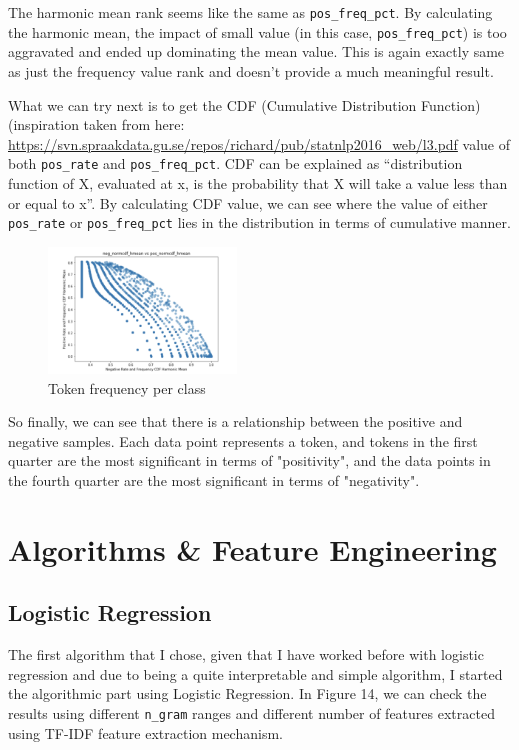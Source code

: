 \documentclass{article}
\begin{document}
The harmonic mean rank seems like the same as \texttt{pos\_freq\_pct}. By calculating the harmonic mean, the impact of small value (in this case, \texttt{pos\_freq\_pct}) is too aggravated and ended up dominating the mean value. This is again exactly same as just the frequency value rank and doesn’t provide a much meaningful result.

What we can try next is to get the CDF (Cumulative Distribution Function) (inspiration taken from here: \url{https://svn.spraakdata.gu.se/repos/richard/pub/statnlp2016_web/l3.pdf} value of both \texttt{pos\_rate} and \texttt{pos\_freq\_pct}. CDF can be explained as “distribution function of X, evaluated at x, is the probability that X will take a value less than or equal to x”. By calculating CDF value, we can see where the value of either \texttt{pos\_rate} or \texttt{pos\_freq\_pct} lies in the distribution in terms of cumulative manner.

	\begin{figure}[h]
		\label{Figure 12}
		\caption{Token frequency per class}
		\includegraphics[width=50mm]{norcdf.png}
		\centering
	\end{figure}


So finally, we can see that there is a relationship between the positive and negative samples. Each data point represents a token, and tokens in the first quarter are the most significant in terms of "positivity", and the data points in the fourth quarter are the most significant in terms of "negativity".


	
	\section{Algorithms \& Feature Engineering}
	\subsection{Logistic Regression}
	
	The first algorithm that I chose, given that I have worked before with logistic regression and due to being a quite interpretable and simple algorithm, I started the algorithmic part using Logistic Regression. In Figure 14, we can check the results using different \texttt{n\_gram} ranges and different number of features extracted using TF-IDF feature extraction mechanism. 
	
\end{document}
